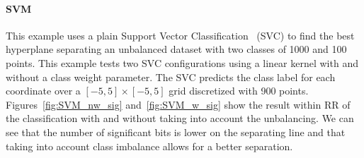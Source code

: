 \documentclass[10pt,journal,compsoc]{IEEEtran}
\begin{document}


\paragraph{SVM}
This example uses a plain Support Vector
Classification~\cite{Platt99probabilisticoutputs} (SVC) to find the best
hyperplane separating an unbalanced dataset with two classes of 1000 and 100
points. This example tests two SVC configurations using a linear kernel with and
without a class weight parameter. The SVC predicts the class label for each
coordinate over a $[-5,5] \times [-5,5]$ grid discretized with 900 points.
Figures~\ref{fig:SVM_nw_sig} and~\ref{fig:SVM_w_sig} show the result within RR
of the classification with and without taking into account the unbalancing. We
can see that the number of significant bits is lower on the separating line and
that taking into account class imbalance allows for a better separation.





\end{document}
